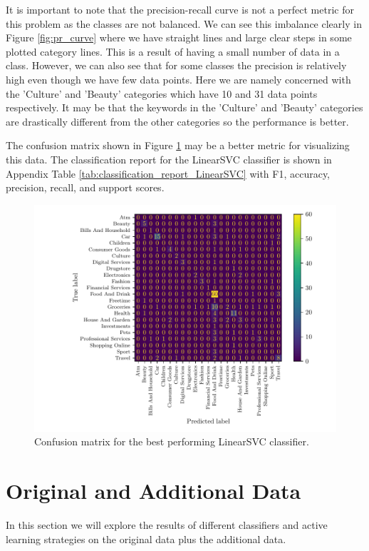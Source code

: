 It is important to note that the precision-recall curve is not a perfect metric for this problem as the classes are not balanced. We can see this imbalance clearly in Figure \ref{fig:pr_curve} where we have straight lines and large clear steps in some plotted category lines. This is a result of having a small number of data in a class. However, we can also see that for some classes the precision is relatively high even though we have few data points. Here we are namely concerned with the 'Culture' and 'Beauty' categories which have 10 and 31 data points respectively. It may be that the keywords in the 'Culture' and 'Beauty' categories are drastically different from the other categories so the performance is better. 

The confusion matrix shown in Figure \ref{fig:confusion_matrix} may be a better metric for visualizing this data. The classification report for the LinearSVC classifier is shown in Appendix Table \ref{tab:classification_report_LinearSVC} with F1, accuracy, precision, recall, and support scores.

\begin{figure}[ht]
  \centering
  \includegraphics[width=\textwidth]{../img/plot_cm_LinearSVC.pdf}
  \caption{Confusion matrix for the best performing LinearSVC classifier.}
  \label{fig:confusion_matrix}
\end{figure}


\section{Original and Additional Data}

In this section we will explore the results of different classifiers and active learning strategies on the original data plus the additional data.